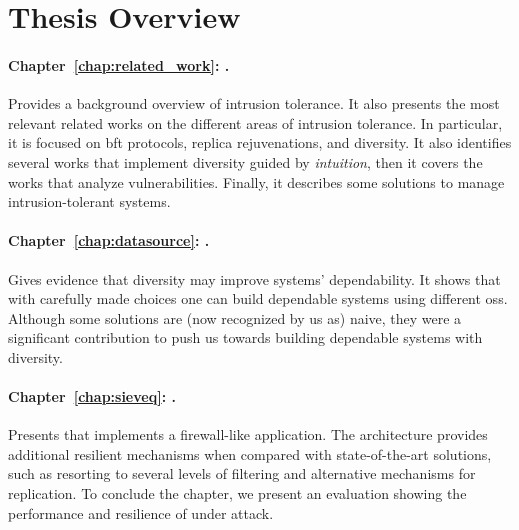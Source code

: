 \vspace{2mm}

\section{Thesis Overview}
\paragraph{Chapter~\ref{chap:related_work}: .}
Provides a background overview of intrusion tolerance. 
It also presents the most relevant related works on the different areas of intrusion tolerance.
In particular, it is focused on \gls{bft} protocols, replica rejuvenations, and diversity.
It also identifies several works that implement diversity guided by \emph{intuition}, then it covers the works that analyze vulnerabilities.
Finally, it describes some solutions to manage intrusion-tolerant systems.


\paragraph{Chapter~\ref{chap:datasource}: .}
Gives evidence that diversity may improve systems' dependability.
It shows that with carefully made choices one can build dependable systems using different \glspl{os}.
Although some solutions are (now recognized by us as) naive, they were a significant contribution to push us towards building dependable systems with diversity.


\paragraph{Chapter~\ref{chap:sieveq}: .}
Presents \sieveq that implements a firewall-like application.
The \sieveq architecture provides additional resilient mechanisms when compared with state-of-the-art solutions, such as resorting to several levels of filtering and alternative mechanisms for replication.
To conclude the chapter, we present an evaluation showing the performance and resilience of \sieveq under attack.


